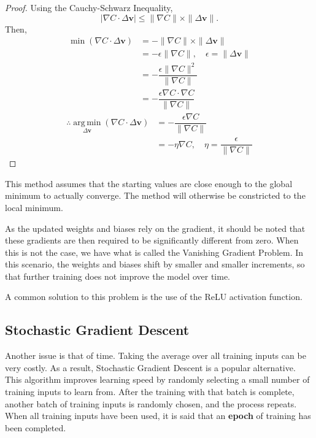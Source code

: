 \documentclass[honours,12pt]{unswthesis}
\numberwithin{equation}{section}
\begin{document}
\begin{proof}
	Using the Cauchy-Schwarz Inequality,
	\[
			|\nabla C\cdot\Delta\mathbf{v}| \le \|\nabla C\|\times\|\Delta\mathbf{v}\|.
	\]
	Then, \begin{align*}
		\min(\nabla C\cdot\Delta\mathbf{v}) & = -\|\nabla C\|\times\|\Delta\mathbf{v}\| \\
		& = -\epsilon\|\nabla C\|,\quad\epsilon = \|\Delta\mathbf{v}\| \\
		& = -\dfrac{\epsilon\|\nabla C\|^2}{\|\nabla C\|} \\
		& = -\dfrac{\epsilon\nabla C\cdot\nabla C}{\|\nabla C\|}
	\end{align*}\begin{align*}
		\therefore\operatorname*{arg\,min}_{\Delta\mathbf{v}}(\nabla C\cdot\Delta\mathbf{v}) & = -\dfrac{\epsilon\nabla C}{\|\nabla C\|} \\
		& = -\eta\nabla C,\quad\eta = \dfrac{\epsilon}{\|\nabla C\|}
	\end{align*}
\end{proof}


This method assumes that the starting values are close enough to the global minimum to actually converge. The method will otherwise be constricted to the local minimum.

As the updated weights and biases rely on the gradient, it should be noted that these gradients are then required to be significantly different from zero. When this is not the case, we have what is called the Vanishing Gradient Problem. In this scenario, the weights and biases shift by smaller and smaller increments, so that further training does not improve the model over time.

A common solution to this problem is the use of the ReLU activation function. 

\subsection{Stochastic Gradient Descent}\label{nnets-stochgraddesc}

Another issue is that of time. Taking the average over all training inputs can be very costly. As a result, Stochastic Gradient Descent is a popular alternative. This algorithm improves learning speed by randomly selecting a small number of training inputs to learn from. After the training with that batch is complete, another batch of training inputs is randomly chosen, and the process repeats. When all training inputs have been used, it is said that an \textbf{epoch} of training has been completed.
\end{document}
